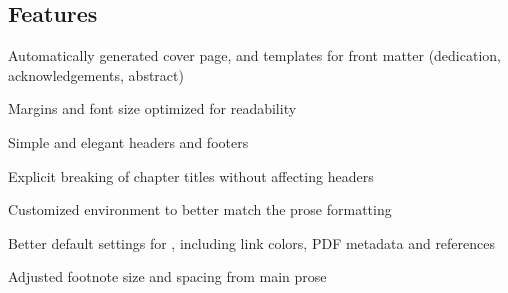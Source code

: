 \documentclass[thesis.tex]{subfiles}
\begin{document}
\subsection*{Features}
\begin{tightemize}
\item Automatically generated cover page, and templates for front matter
      (dedication, acknowledgements, abstract)
\item Margins and font size optimized for readability
\item Simple and elegant headers and footers
\item Explicit breaking of chapter titles without affecting headers
\item Customized  environment to better match the prose
      formatting
\item Better default settings for , including link colors, PDF
      metadata and references
\item Adjusted footnote size and spacing from main prose
\end{tightemize}
\end{document}
